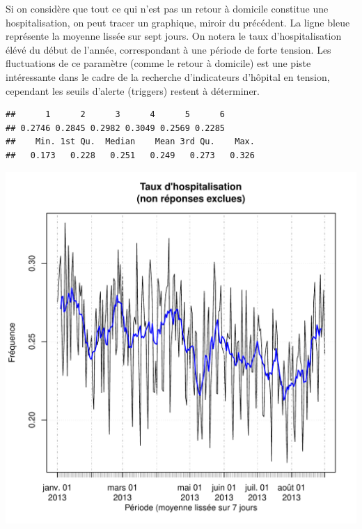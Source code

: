 \documentclass[12pt,english,french,twoside]{report}\usepackage[]{graphicx}\usepackage[]{color}
\makeatletter
\def\maxwidth{ %
  \ifdim\Gin@nat@width>\linewidth
    \linewidth
  \else
    \Gin@nat@width
  \fi
}
\newenvironment{kframe}{%
 \def\at@end@of@kframe{}%
 \ifinner\ifhmode%
  \def\at@end@of@kframe{\end{minipage}}%
  \begin{minipage}{\columnwidth}%
 \fi\fi%
 \def\FrameCommand##1{\hskip\@totalleftmargin \hskip-\fboxsep
 \colorbox{shadecolor}{##1}\hskip-\fboxsep
     \hskip-\linewidth \hskip-\@totalleftmargin \hskip\columnwidth}%
 \MakeFramed {\advance\hsize-\width
   \@totalleftmargin\z@ \linewidth\hsize
   \@setminipage}}%
 {\par\unskip\endMakeFramed%
 \at@end@of@kframe}
\newenvironment{knitrout}{}{} %
\makeatother
\begin{document}
Si on considère que tout ce qui n'est pas un retour à domicile constitue une hospitalisation, on peut tracer un graphique, miroir du précédent. La ligne bleue représente la moyenne lissée sur sept jours. On notera le taux d'hospitalisation élévé du début de l'année, correspondant à une période de forte tension. Les fluctuations de ce paramètre (comme le retour à domicile) est une piste intéressante dans le cadre de la recherche d'indicateurs d'hôpital en tension, cependant les seuils d'alerte (triggers) restent à déterminer.
\begin{knitrout}
\color{fgcolor}\begin{kframe}
\begin{verbatim}
##      1      2      3      4      5      6 
## 0.2746 0.2845 0.2982 0.3049 0.2569 0.2285
##    Min. 1st Qu.  Median    Mean 3rd Qu.    Max. 
##   0.173   0.228   0.251   0.249   0.273   0.326
\end{verbatim}
\end{kframe}
\includegraphics[width=\maxwidth]{figure/hospit} 

\end{knitrout}
\end{document}
